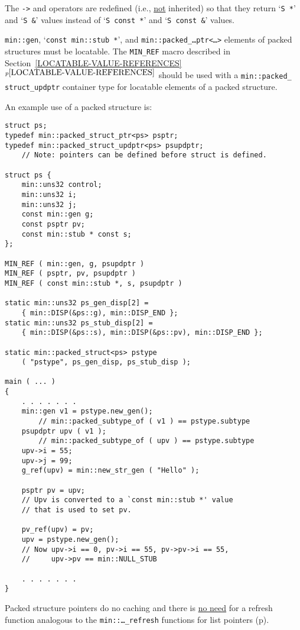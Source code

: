 \documentclass[12pt]{article}
\newcommand{\itemref}[1]{\ref{#1}$^{p\pageref{#1}}$}
\newcommand{\pagref}[1]{p\pageref{#1}}
\newcommand{\EOL}{\penalty \exhyphenpenalty}
\newcommand{\BRACKETED}[1]{{\tt <#1>}}
\newenvironment{indpar}[1][0.3in]%
	{\begin{list}{}%
		     {\setlength{\itemsep}{0in}%
		      \setlength{\topsep}{0in}%
		      \setlength{\parsep}{1ex}%
		      \setlength{\labelwidth}{#1}%
		      \setlength{\leftmargin}{#1}%
		      \addtolength{\leftmargin}{\labelsep}}%
	 \item}%
	{\end{list}}
\begin{document}
The {\tt ->} and {\tt *} operators are redefined (i.e., \underline{not}
inherited) so that they
return `{\tt S~*}' and `{\tt S~\&}' values instead of
`{\tt S~const~*}' and `{\tt S~const~\&}' values.

{\tt min::gen}, `{\tt const min::stub~*}', and
{\tt min::\EOL packed\_\EOL\ldots ptr\BRACKETED{\ldots}}
elements of packed structures must be locatable.
The {\tt MIN\_REF}\label{PACKED_STRUCT_MIN_REF}
macro described in Section~\itemref{LOCATABLE-VALUE-REFERENCES}
should be used with a {\tt min::\EOL packed\_\EOL
struct\_\EOL updptr\SARG} container type
for locatable elements of a packed structure.

An example use of a packed structure is:
\begin{indpar}\begin{verbatim}
struct ps;
typedef min::packed_struct_ptr<ps> psptr;
typedef min::packed_struct_updptr<ps> psupdptr;
    // Note: pointers can be defined before struct is defined.

struct ps {
    min::uns32 control;
    min::uns32 i;
    min::uns32 j;
    const min::gen g;
    const psptr pv;
    const min::stub * const s;
};

MIN_REF ( min::gen, g, psupdptr )
MIN_REF ( psptr, pv, psupdptr )
MIN_REF ( const min::stub *, s, psupdptr )

static min::uns32 ps_gen_disp[2] =
    { min::DISP(&ps::g), min::DISP_END };
static min::uns32 ps_stub_disp[2] =
    { min::DISP(&ps::s), min::DISP(&ps::pv), min::DISP_END };

static min::packed_struct<ps> pstype
    ( "pstype", ps_gen_disp, ps_stub_disp );

main ( ... )
{
    . . . . . . .
    min::gen v1 = pstype.new_gen();
        // min::packed_subtype_of ( v1 ) == pstype.subtype
    psupdptr upv ( v1 );
        // min::packed_subtype_of ( upv ) == pstype.subtype
    upv->i = 55;
    upv->j = 99;
    g_ref(upv) = min::new_str_gen ( "Hello" );

    psptr pv = upv;
    // Upv is converted to a `const min::stub *' value
    // that is used to set pv.

    pv_ref(upv) = pv;
    upv = pstype.new_gen();
    // Now upv->i == 0, pv->i == 55, pv->pv->i == 55,
    //     upv->pv == min::NULL_STUB

    . . . . . . .
}
\end{verbatim}\end{indpar}

Packed structure pointers do no caching and
there is \underline{no need} for
a refresh function analogous to the {\tt min::\EOL \ldots\_\EOL refresh}
functions for list pointers (\pagref{LIST-POINTER-CACHE}).
\end{document}
